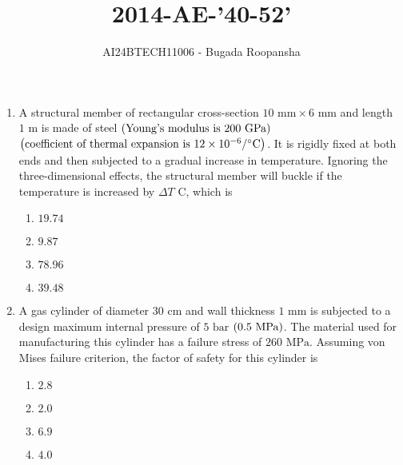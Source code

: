 \documentclass[journal,12pt,twocolumn]{IEEEtran}
\theoremstyle{remark}
\begin{document}

\vspace{3cm}
\title{2014-AE-'40-52'}
\author{AI24BTECH11006 - Bugada Roopansha}
\maketitle

\begin{enumerate}[start=40]
 
    \item A structural member of rectangular cross-section $10 \text{ mm} \times 6 \text{ mm}$ and length $1 \text{ m}$ is made of steel $\left(\text{Young's modulus is } 200 \text{ GPa}\right)$ $\left(\text{coefficient of thermal expansion is } 12 \times 10^{-6}/^{\circ}\text{C}\right)$. It is rigidly fixed at both ends and then subjected to a gradual increase in temperature. Ignoring the three-dimensional effects, the structural member will buckle if the temperature is increased by $\Delta T$ \degree C, which is
    \begin{enumerate}
        \item $19.74$
        \item $9.87$
        \item $78.96$
        \item $39.48$
    \end{enumerate}


    \item A gas cylinder  of diameter $30 \text{ cm}$ and wall thickness $1 \text{ mm}$ is subjected to a design maximum internal pressure of $5 \text{ bar}$ $\left(0.5 \text{ MPa}\right)$. The material used for manufacturing this cylinder has a failure stress of $260 \text{ MPa}$. Assuming von Mises failure criterion, the factor of safety  for this cylinder is
    \begin{enumerate}
        \item $2.8$
        \item $2.0$
        \item $6.9$
        \item $4.0$
    \end{enumerate}


\end{enumerate}
\end{document}
